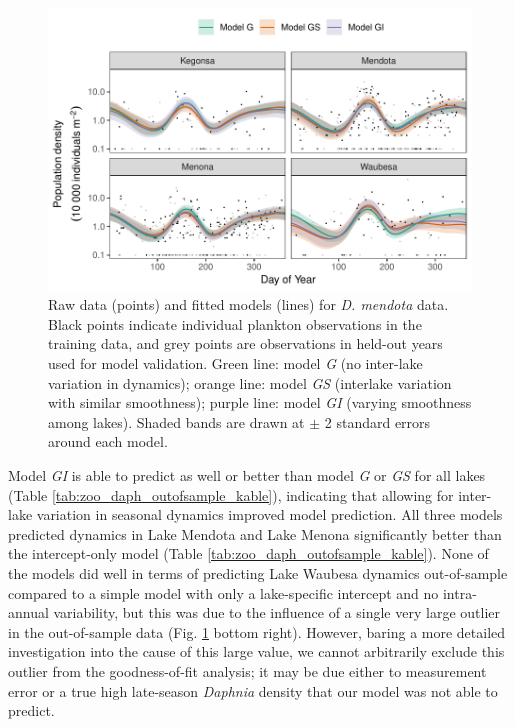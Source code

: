 \documentclass[12pt]{article}
\begin{document}
\begin{figure}
\centering
\includegraphics{../figures/zoo_daph_plot-1.pdf}
\caption{\label{fig:daph_smooth}Raw data (points) and fitted models
(lines) for \textit{D. mendota} data. Black points indicate individual
plankton observations in the training data, and grey points are
observations in held-out years used for model validation. Green line:
model \emph{G} (no inter-lake variation in dynamics); orange line: model
\emph{GS} (interlake variation with similar smoothness); purple line:
model \emph{GI} (varying smoothness among lakes). Shaded bands are drawn
at \(\pm\) 2 standard errors around each model.}
\end{figure}

Model \emph{GI} is able to predict as well or better than model \emph{G}
or \emph{GS} for all lakes (Table \ref{tab:zoo_daph_outofsample_kable}),
indicating that allowing for inter-lake variation in seasonal dynamics
improved model prediction. All three models predicted dynamics in Lake
Mendota and Lake Menona significantly better than the intercept-only
model (Table \ref{tab:zoo_daph_outofsample_kable}). None of the models
did well in terms of predicting Lake Waubesa dynamics out-of-sample
compared to a simple model with only a lake-specific intercept and no
intra-annual variability, but this was due to the influence of a single
very large outlier in the out-of-sample data (Fig. \ref{fig:daph_smooth}
bottom right). However, baring a more detailed investigation into the
cause of this large value, we cannot arbitrarily exclude this outlier
from the goodness-of-fit analysis; it may be due either to measurement
error or a true high late-season \emph{Daphnia} density that our model
was not able to predict.
\end{document}
